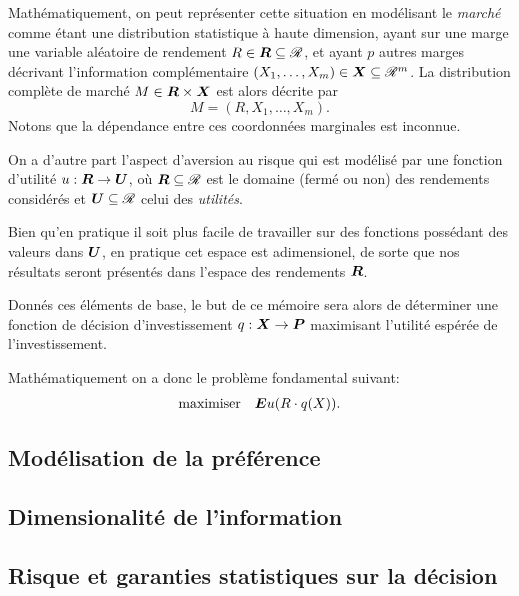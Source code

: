 Mathématiquement, on peut représenter cette situation en modélisant le \textit{marché}
comme étant une distribution statistique à haute dimension, ayant sur une marge une
variable aléatoire de rendement $R \in \bm{R} \subseteq \mathscr{R}$, et ayant $p$ autres marges décrivant
l'information complémentaire $(X_1,\dots,X_m) \in \bm{X} \subseteq \mathscr{R}^m$. La distribution complète de
marché $M \in \bm{R} \times \bm{X}$ est alors décrite par
\begin{equation}
  M = (R,X_1,\dots,X_m).
\end{equation}
Notons que la dépendance entre ces coordonnées marginales est inconnue.

On a d'autre part l'aspect d'aversion au risque qui est modélisé par une fonction
d'utilité $u:\bm{R}\to\bm{U}$, où $\bm{R} \subseteq \mathscr{R}$ est le domaine (fermé ou non) des rendements considérés
et $\bm{U} \subseteq \mathscr{R}$ celui des \textit{utilités}.

Bien qu'en pratique il soit plus facile de travailler sur des fonctions possédant des
valeurs dans $\bm{U}$, en pratique cet espace est adimensionel\cit, de sorte que nos résultats
seront présentés dans l'espace des rendements $\bm{R}$.

Donnés ces éléments de base, le but de ce mémoire sera alors de déterminer une fonction de
décision d'investissement $q: \bm{X} \to \bm{P}$ maximisant l'utilité espérée de l'investissement.

Mathématiquement on a donc le problème fondamental suivant:
\begin{equation}
  \begin{array}{ll}\operatorname*{maximiser} & \displaystyle{\bm Eu(R \cdot q(X)).}\end{array}
\end{equation}


\subsection{Modélisation de la préférence}

\subsection{Dimensionalité de l'information}




\subsection{Risque et garanties statistiques sur la décision}




